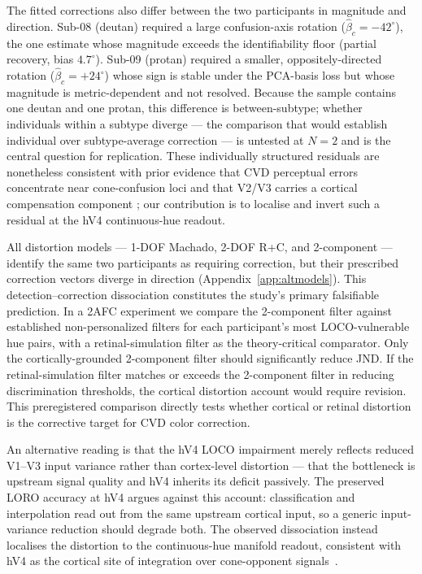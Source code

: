 The fitted corrections also differ between the two participants in magnitude and direction.
Sub-08 (deutan) required a large confusion-axis rotation ($\hat\beta_c = -42^\circ$), the one estimate whose magnitude exceeds the identifiability floor (partial recovery, bias $4.7^\circ$).
Sub-09 (protan) required a smaller, oppositely-directed rotation ($\hat\beta_c = +24^\circ$) whose sign is stable under the PCA-basis loss but whose magnitude is metric-dependent and not resolved.
Because the sample contains one deutan and one protan, this difference is between-subtype; whether individuals within a subtype diverge --- the comparison that would establish individual over subtype-average correction --- is untested at $N = 2$ and is the central question for replication.
These individually structured residuals are nonetheless consistent with prior evidence that CVD perceptual errors concentrate near cone-confusion loci \cite{emery2021} and that V2/V3 carries a cortical compensation component \cite{tregillus2021}; our contribution is to localise and invert such a residual at the hV4 continuous-hue readout.

All distortion models --- 1-DOF Machado, 2-DOF R+C, and 2-component --- identify the same two participants as requiring correction, but their prescribed correction vectors diverge in direction (Appendix~\ref{app:altmodels}).
This detection--correction dissociation constitutes the study's primary falsifiable prediction.
In a 2AFC experiment we compare the 2-component filter against established non-personalized filters for each participant's most LOCO-vulnerable hue pairs, with a retinal-simulation filter as the theory-critical comparator. Only the cortically-grounded 2-component filter should significantly reduce JND.
If the retinal-simulation filter matches or exceeds the 2-component filter in reducing discrimination thresholds, the cortical distortion account would require revision.
This preregistered comparison directly tests whether cortical or retinal distortion is the corrective target for CVD color correction.

An alternative reading is that the hV4 LOCO impairment merely reflects reduced V1--V3 input variance rather than cortex-level distortion --- that the bottleneck is upstream signal quality and hV4 inherits its deficit passively.
The preserved LORO accuracy at hV4 argues against this account: classification and interpolation read out from the same upstream cortical input, so a generic input-variance reduction should degrade both.
The observed dissociation instead localises the distortion to the continuous-hue manifold readout, consistent with hV4 as the cortical site of integration over cone-opponent signals~\cite{brouwer2009, bannert2018}.

